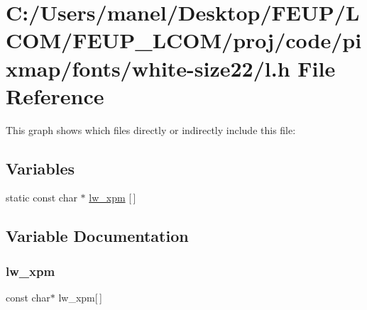 \hypertarget{white-size22_2l_8h}{}\section{C\+:/\+Users/manel/\+Desktop/\+F\+E\+U\+P/\+L\+C\+O\+M/\+F\+E\+U\+P\+\_\+\+L\+C\+O\+M/proj/code/pixmap/fonts/white-\/size22/l.h File Reference}
\label{white-size22_2l_8h}
This graph shows which files directly or indirectly include this file\+:
\subsection*{Variables}
\begin{DoxyCompactItemize}
\item 
static const char $\ast$ \mbox{\hyperlink{white-size22_2l_8h_a5d203b79bf0acabc02b612caeacd2465}{lw\+\_\+xpm}} \mbox{[}$\,$\mbox{]}
\end{DoxyCompactItemize}


\subsection{Variable Documentation}
\mbox{\label{white-size22_2l_8h_a5d203b79bf0acabc02b612caeacd2465}} 
\subsubsection{\texorpdfstring{lw\_xpm}{lw\_xpm}}
{\footnotesize\ttfamily const char$\ast$ lw\+\_\+xpm\mbox{[}$\,$\mbox{]}\hspace{0.3cm}{\ttfamily [static]}}

